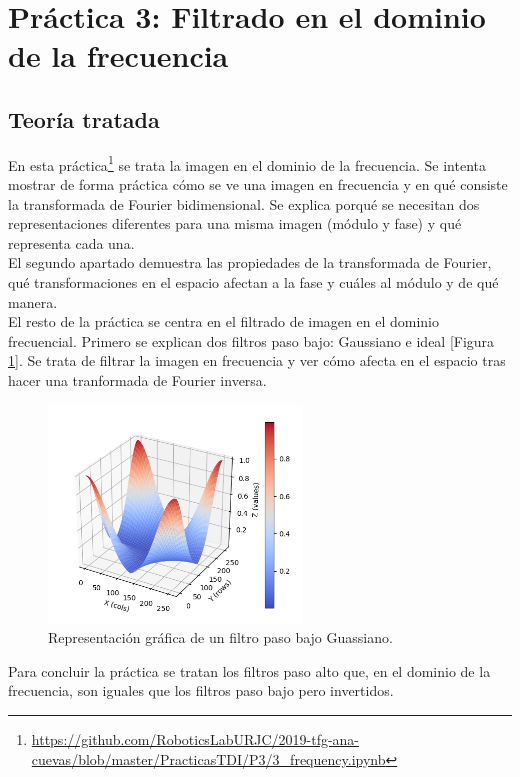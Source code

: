 \section{Práctica 3: Filtrado en el dominio de la frecuencia}
\subsection{Teoría tratada}

En esta práctica\footnote{\url{https://github.com/RoboticsLabURJC/2019-tfg-ana-cuevas/blob/master/PracticasTDI/P3/3_frequency.ipynb}} se trata la imagen en el dominio de la frecuencia. Se intenta mostrar de forma práctica cómo se ve una imagen en frecuencia y en qué consiste la transformada de Fourier bidimensional. Se explica porqué se necesitan dos representaciones diferentes para una misma imagen (módulo y fase) y qué representa cada una.\\

El segundo apartado demuestra las propiedades de la transformada de Fourier, qué transformaciones en el espacio afectan a la fase y cuáles al módulo y de qué manera.\\

El resto de la práctica se centra en el filtrado de imagen en el dominio frecuencial. Primero se explican dos filtros paso bajo: Gaussiano e ideal [Figura \ref {gauss}]. Se trata de filtrar la imagen en frecuencia y ver cómo afecta en el espacio tras hacer una tranformada de Fourier inversa.
\begin{figure}[h]
\centering
\includegraphics[width=0.6\textwidth]{imagenes/gaussfpb}
\caption{Representación gráfica de un filtro paso bajo Guassiano.}
\label{gauss}
\end{figure}

 Para concluir la práctica se tratan los filtros paso alto que, en el dominio de la frecuencia, son iguales que los filtros paso bajo pero invertidos.

